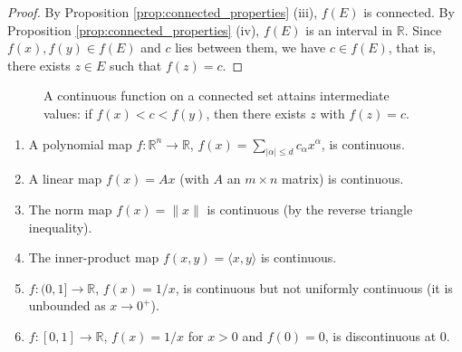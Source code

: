\begin{proof}
By Proposition \ref{prop:connected_properties} (iii), $f(E)$ is connected. By Proposition \ref{prop:connected_properties} (iv), $f(E)$ is an interval in $\mathbb{R}$. Since $f(x), f(y) \in f(E)$ and $c$ lies between them, we have $c \in f(E)$, that is, there exists $z \in E$ such that $f(z) = c$.
\end{proof}

\begin{figure}[htbp]
\centering
{}
\caption{A continuous function on a connected set attains intermediate values: if $f(x) < c < f(y)$, then there exists $z$ with $f(z)=c$.}
\label{fig:intermediate_value}
\end{figure}

\begin{example}\label{ex:continuous_examples}
\begin{enumerate}[label=(\roman*)]
    \item A polynomial map $f: \mathbb{R}^n \to \mathbb{R}$, $f(x) = \sum_{|\alpha| \le d} c_\alpha x^\alpha$, is continuous.
    \item A linear map $f(x) = Ax$ (with $A$ an $m \times n$ matrix) is continuous.
    \item The norm map $f(x) = \|x\|$ is continuous (by the reverse triangle inequality).
    \item The inner-product map $f(x, y) = \langle x, y \rangle$ is continuous.
    \item $f: (0, 1] \to \mathbb{R}$, $f(x) = 1/x$, is continuous but not uniformly continuous (it is unbounded as $x \to 0^+$).
    \item $f: [0, 1] \to \mathbb{R}$, $f(x) = 1/x$ for $x > 0$ and $f(0) = 0$, is discontinuous at $0$.
\end{enumerate}
\end{example}

